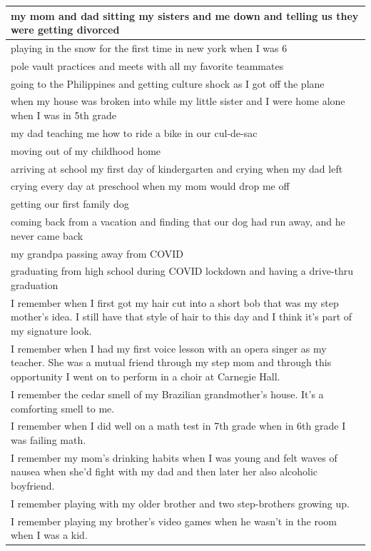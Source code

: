 \documentclass[
  .7em,
  letterpaper,
  DIV=11,
  numbers=noendperiod]{scrartcl}
\begin{document}
\begin{table}
\begin{tabular}{l}
\hline
my mom and dad sitting my sisters and me down and telling us they were getting divorced\\
\hline
playing in the snow for the first time in new york when I was 6\\
\hline
pole vault practices and meets with all my favorite teammates\\
\hline
going to the Philippines and getting culture shock as I got off the plane\\
\hline
when my house was broken into while my little sister and I were home alone when I was in 5th grade\\
\hline
my dad teaching me how to ride a bike in our cul-de-sac\\
\hline
moving out of my childhood home\\
\hline
arriving at school my first day of kindergarten and crying when my dad left\\
\hline
crying every day at preschool when my mom would drop me off\\
\hline
getting our first family dog\\
\hline
coming back from a vacation and finding that our dog had run away, and he never came back\\
\hline
my grandpa passing away from COVID\\
\hline
graduating from high school during COVID lockdown and having a drive-thru graduation\\
\hline
I remember when I first got my hair cut into a short bob that was my step mother's idea. I still have that style of hair to this day and I think it's part of my signature look.\\
\hline
I remember when I had my first voice lesson with an opera singer as my teacher.  She was a mutual friend through my step mom and through this opportunity I went on to perform in a choir at Carnegie Hall.\\
\hline
I remember the cedar smell of my Brazilian grandmother's house. It's a comforting smell to me.\\
\hline
I remember when I did well on a math test in 7th grade when in 6th grade I was failing math.\\
\hline
I remember my mom's drinking habits when I was young and felt waves of nausea when she'd fight with my dad and then later her also alcoholic boyfriend.\\
\hline
I remember playing with my older brother and two step-brothers growing up.\\
\hline
I remember playing my brother's video games when he wasn't in the room when I was a kid.\\

\end{tabular}
\end{table}
\end{document}
